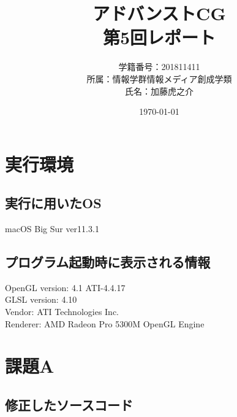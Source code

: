 \documentclass[a4paper,10pt,uplatex,dvipdfmx]{jsarticle}
\begin{document}
\title{アドバンストCG\\ \huge 第5回レポート}
\author{学籍番号：201811411\\ 所属：情報学群情報メディア創成学類\\ 氏名：加藤虎之介}
\date{\today}
\maketitle

\section{実行環境}
\subsection{実行に用いたOS}
macOS Big Sur ver11.3.1

\subsection{プログラム起動時に表示される情報}
\begin{screen}
  OpenGL version: 4.1 ATI-4.4.17\\
  GLSL version: 4.10\\
  Vendor: ATI Technologies Inc.\\
  Renderer: AMD Radeon Pro 5300M OpenGL Engine
\end{screen}

\section{課題A}
\subsection{修正したソースコード}
\end{document}
